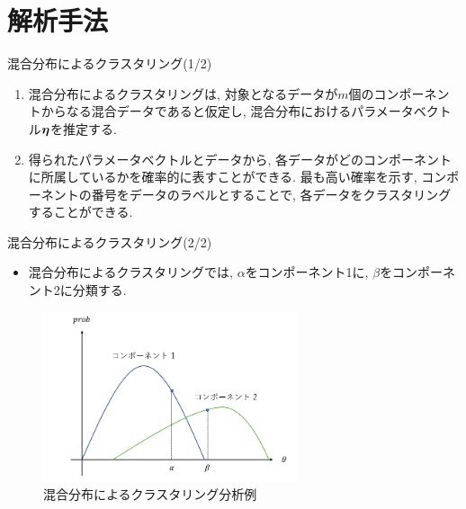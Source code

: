 \documentclass[dvipdfmx]{beamer} %
\newcommand{\bm}[1]{\mbox{\boldmath $#1$}}
\begin{document}
\section{解析手法}
\begin{frame}{混合分布によるクラスタリング(1/2)}
\begin{enumerate}
\item
混合分布によるクラスタリングは, 対象となるデータが$m$個のコンポーネントからなる混合データであると仮定し, 混合分布におけるパラメータベクトル$\bm \eta$を推定する. 

\vspace{0.2cm}
\item
得られたパラメータベクトルとデータから, 各データがどのコンポーネントに所属しているかを確率的に表すことができる. 最も高い確率を示す, コンポーネントの番号をデータのラベルとすることで, 各データをクラスタリングすることができる.　
 
\end{enumerate}

\end{frame}

\begin{frame}{混合分布によるクラスタリング(2/2)}

\begin{itemize}
	\item 混合分布によるクラスタリングでは, $\alpha$をコンポーネント1に, $\beta$をコンポーネント2に分類する.
\end{itemize}

\begin{figure}[tbp]
\begin{center}
\includegraphics[clip,height= 50mm]{data/mix_cluster.png}
\end{center}
\caption{混合分布によるクラスタリング分析例}
\label{mix_cluster}
\end{figure}

\end{frame}
\end{document}
